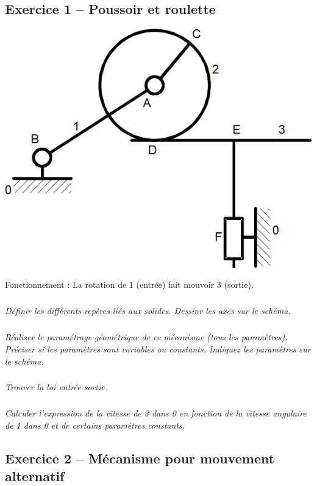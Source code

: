 \documentclass[11pt,oneside]{article}
\begin{document}
\subsection*{Exercice 1 -- Poussoir et roulette}
 
\begin{center}
\includegraphics[width=.6\textwidth]{png/fig1_1} 
\end{center}
Fonctionnement : La rotation de 1 (entrée) fait mouvoir 3 (sortie).

\subparagraph{}
\textit{Définir les différents repères liés aux solides. Dessinr les axes sur le schéma.}


\subparagraph{}
\textit{Réaliser le paramétrage géométrique de ce mécanisme (tous les paramètres). Préciser si les paramètres sont variables ou constants. Indiquez les paramètres sur le schéma.}


\subparagraph{}
\textit{Trouver la loi entrée sortie.}



\subparagraph{}
\textit{Calculer l'expression de la vitesse de 3 dans 0 en fonction de la vitesse angulaire de 1 dans 0 et de certains paramètres constants.}



\subsection*{Exercice 2 -- Mécanisme pour mouvement alternatif}
\setcounter{subparagraph}{0}
 
\end{document}
